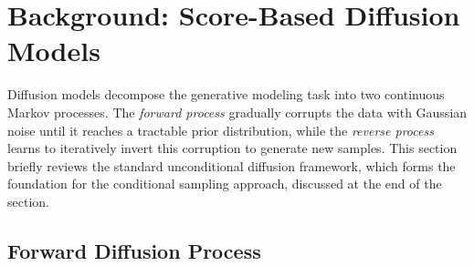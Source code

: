 \documentclass[a4paper,11pt]{article}
\theoremstyle{definition}
\theoremstyle{plain}
\theoremstyle{remark}
\begin{document}
\section{Background: Score-Based Diffusion Models}\label{sec:diffusion}

Diffusion models decompose the generative modeling task into two continuous Markov processes. The \textit{forward process} gradually corrupts the data with Gaussian noise until it reaches a tractable prior distribution, while the \textit{reverse process} learns to iteratively invert this corruption to generate new samples. This section briefly reviews the standard unconditional diffusion framework, which forms the foundation for the conditional sampling approach, discussed at the end of the section.



\subsection{Forward Diffusion Process}
\label{sec:fd}
\end{document}
